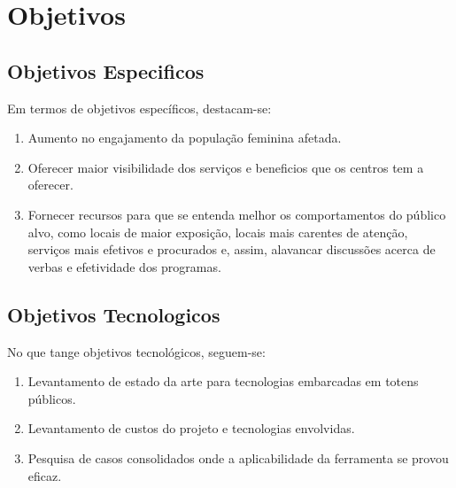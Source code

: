 \section{Objetivos}
\vspace*{1cm}
\subsection{Objetivos Especificos}
Em termos de objetivos específicos, destacam-se:
\begin{enumerate}
\item Aumento no engajamento da população feminina afetada.
\item Oferecer maior visibilidade dos serviços e beneficios que os centros tem a oferecer.
\item Fornecer recursos para que se entenda melhor os comportamentos do público alvo, como locais de maior exposição, locais mais carentes de atenção, serviços mais efetivos e procurados e, assim, alavancar discussões acerca de verbas e efetividade dos programas.
\end{enumerate}
\subsection{Objetivos Tecnologicos}
No que tange objetivos tecnológicos, seguem-se:
\begin{enumerate}
\item Levantamento de estado da arte para tecnologias embarcadas em totens públicos.
\item Levantamento de custos do projeto e tecnologias envolvidas.
\item Pesquisa de casos consolidados onde a aplicabilidade da ferramenta se provou eficaz.
\end{enumerate}
\newpage